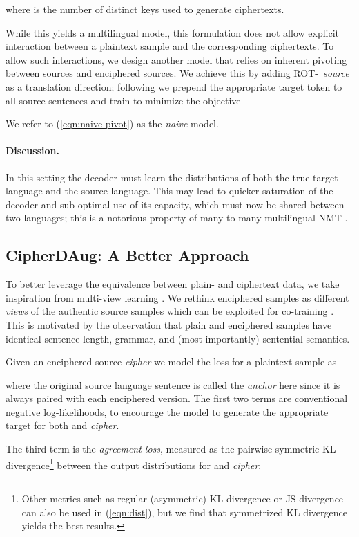 \documentclass[11pt]{article}
\begin{document}
where  is the number of distinct keys used to generate ciphertexts. 

While this yields a multilingual model, this formulation does not allow explicit interaction between a plaintext sample and the corresponding ciphertexts. 
To allow such interactions, we design another model that relies on inherent pivoting between sources and enciphered sources. 
We achieve this by adding \hbox{ROT- \emph{source}} as a translation direction; following \citet{johnson2017google} we prepend the appropriate target token to all  source sentences and train to minimize the objective


We refer to (\ref{eqn:naive-pivot}) as the \textit{naive} model.

\paragraph{Discussion.} 
In this setting the decoder must learn the distributions of both the true target language and the source language.
This may lead to quicker saturation of the decoder and sub-optimal use of its capacity, which must now be shared between two languages; this is a notorious property of many-to-many multilingual NMT \cite{aharoni-etal-2019-massively}.



\subsection{CipherDAug: A Better Approach}\label{sec:cipherdaug}
To better leverage the equivalence between plain- and ciphertext data, we take inspiration from multi-view learning \cite{xu2013survey}. We rethink enciphered samples
as different \emph{views} of the authentic source samples which can be exploited for co-training \cite{blum1998combining}. This is motivated by the observation that plain and enciphered samples have identical sentence length, grammar, and (most importantly) sentential semantics. 

Given an enciphered source \textit{cipher} we model the loss for a plaintext sample  as

where the original source language sentence  is called the \emph{anchor} here since it is always paired with each enciphered version. The first two terms are conventional negative log-likelihoods, to encourage the model to generate the appropriate target for both  and \textit{cipher}.


The third term is the \textit{agreement loss}, measured as the pairwise symmetric KL divergence\footnote{
Other metrics such as regular (asymmetric) KL divergence or JS divergence can also be used in (\ref{eqn:dist}), but we find that symmetrized KL divergence yields the best results.
} between the output distributions for  and \textit{cipher}:
\end{document}
